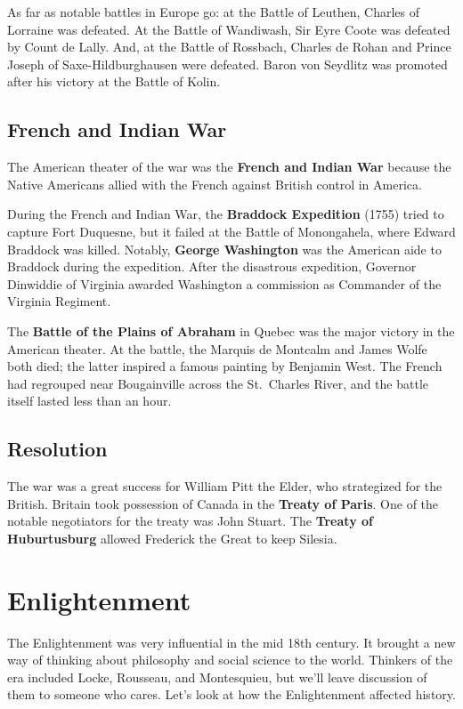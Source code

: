 As far as notable battles in Europe go: at the Battle of Leuthen, Charles of Lorraine was defeated.
At the Battle of Wandiwash, Sir Eyre Coote was defeated by Count de Lally.
And, at the Battle of Rossbach, Charles de Rohan and Prince Joseph of Saxe-Hildburghausen were defeated.
Baron von Seydlitz was promoted after his victory at the Battle of Kolin.

\subsection*{French and Indian War}

The American theater of the war was the \textbf{French and Indian War}
because the Native Americans allied with the French against British control in America.

During the French and Indian War, the \textbf{Braddock Expedition} (1755) tried to capture Fort Duquesne,
but it failed at the Battle of Monongahela, where Edward Braddock was killed.
Notably, \textbf{George Washington} was the American aide to Braddock during the expedition.
After the disastrous expedition,
Governor Dinwiddie of Virginia awarded Washington a commission as Commander of the Virginia Regiment.

The \textbf{Battle of the Plains of Abraham} in Quebec was the major victory in the American theater.
At the battle, the Marquis de Montcalm and James Wolfe both died;
the latter inspired a famous painting by Benjamin West.
The French had regrouped near Bougainville across the St.\ Charles River,
and the battle itself lasted less than an hour.

\subsection*{Resolution}

The war was a great success for William Pitt the Elder, who strategized for the British.
Britain took possession of Canada in the \textbf{Treaty of Paris}.
One of the notable negotiators for the treaty was John Stuart.
The \textbf{Treaty of Huburtusburg} allowed Frederick the Great to keep Silesia.

\section{Enlightenment}

The Enlightenment was very influential in the mid 18th century.
It brought a new way of thinking about philosophy and social science to the world.
Thinkers of the era included Locke, Rousseau, and Montesquieu, but we'll leave discussion of them to someone who cares.
Let's look at how the Enlightenment affected history.

